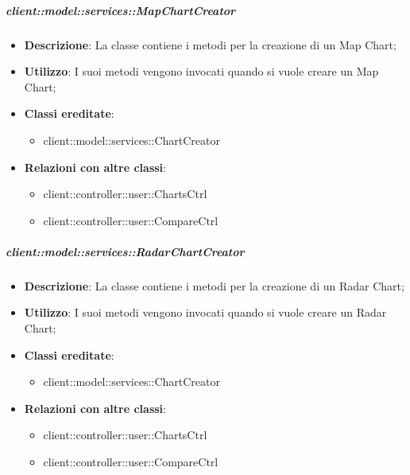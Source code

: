 \begin{itemize}
		\subparagraph{client::model::services::MapChartCreator} %
		\label{subp:mapchartcreator}
			\begin{itemize}
				\item \textbf{Descrizione}: La classe contiene i metodi per la creazione di un Map Chart;
				\item \textbf{Utilizzo}: I suoi metodi vengono invocati quando si vuole creare un Map Chart;
				\item \textbf{Classi ereditate}:					
					\begin{itemize}
						\item client::model::services::ChartCreator
					\end{itemize}
				\item \textbf{Relazioni con altre classi}:					
					\begin{itemize}
						\item client::controller::user::ChartsCtrl
						\item client::controller::user::CompareCtrl
					\end{itemize}
			\end{itemize}

		\subparagraph{client::model::services::RadarChartCreator} %
		\label{subp:radarchartcreator}
			\begin{itemize}
				\item \textbf{Descrizione}: La classe contiene i metodi per la creazione di un Radar Chart;
				\item \textbf{Utilizzo}: I suoi metodi vengono invocati quando si vuole creare un Radar Chart;
				\item \textbf{Classi ereditate}:					
					\begin{itemize}
						\item client::model::services::ChartCreator
					\end{itemize}
				\item \textbf{Relazioni con altre classi}:					
					\begin{itemize}
						\item client::controller::user::ChartsCtrl
						\item client::controller::user::CompareCtrl
					\end{itemize}
			\end{itemize}


\end{itemize}
